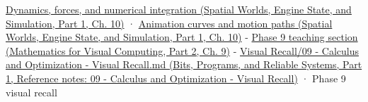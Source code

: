 \hypertarget{appendix-18eacf61a04b-full-teaching-explanation}{}

\href{../05-Spatial-Worlds-Engine-State-and-Simulation-P01/main.pdf\#04-visual-computing-ii-ch029-dynamics-forces-and-numerical-integration}{Dynamics, forces, and numerical integration (Spatial Worlds, Engine State, and Simulation, Part 1, Ch. 10)} · \href{../05-Spatial-Worlds-Engine-State-and-Simulation-P01/main.pdf\#04-visual-computing-ii-ch029-animation-curves-and-motion-paths}{Animation curves and motion paths (Spatial Worlds, Engine State, and Simulation, Part 1, Ch. 10)} - \href{../02-Mathematics-for-Visual-Computing-P02/main.pdf\#02-foundations-ii-ch025-odes-and-numerical-simulation}{Phase 9 teaching section (Mathematics for Visual Computing, Part 2, Ch. 9)} - \href{../01-Bits-Programs-and-Reliable-Systems-P01/main.pdf\#appendix-adf48f5dc5c1}{Visual Recall/09 - Calculus and Optimization - Visual Recall.md (Bits, Programs, and Reliable Systems, Part 1, Reference notes: 09 - Calculus and Optimization - Visual Recall)} · Phase 9 visual recall
